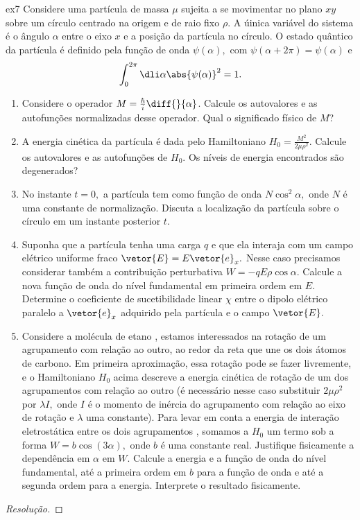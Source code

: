 \begin{exercício}{}{ex7}
    Considere uma partícula de massa \(\mu\) sujeita a se movimentar no plano \(xy\) sobre um círculo centrado na origem e de raio fixo \(\rho\). A úinica variável do sistema é o ângulo \(\alpha\) entre o eixo \(x\) e a posição da partícula no círculo. O estado quântico da partícula é definido pela função de onda \(\psi(\alpha),\) com \(\psi(\alpha + 2\pi) = \psi(\alpha)\) e
    \begin{equation*}
       \int_0^{2\pi}{\dli\alpha \abs{\psi(\alpha)}^2} = 1.
    \end{equation*}
    \begin{enumerate}[label=(\alph*)]
       \item Considere o operador \(M = \frac{\hbar}{i} \diff{}{\alpha}\). Calcule os autovalores e as autofunções normalizadas desse operador. Qual o significado físico de \(M\)?
       \item A energia cinética da partícula é dada pelo Hamiltoniano \(H_0 = \frac{M^2}{2 \mu \rho^2}.\) Calcule os autovalores e as autofunções de \(H_0.\) Os níveis de energia encontrados são degenerados?
       \item No instante \(t = 0,\) a partícula tem como função de onda \(N \cos^2 \alpha,\) onde \(N\) é uma constante de normalização. Discuta a localização da partícula sobre o círculo em um instante posterior \(t.\)
       \item Suponha que a partícula tenha uma carga \(q\) e que ela interaja com um campo elétrico uniforme fraco \(\vetor{E} = E\vetor{e}_x.\) Nesse caso precisamos considerar também a contribuição perturbativa \(W = -q E \rho \cos\alpha.\) Calcule a nova função de onda do nível fundamental em primeira ordem em \(E.\) Determine o coeficiente de sucetibilidade linear \(\chi\) entre o dipolo elétrico paralelo a \(\vetor{e}_x\) adquirido pela partícula e o campo \(\vetor{E}.\)
       \item Considere a molécula de etano , estamos interessados na rotação de um agrupamento  com relação ao outro, ao redor da reta que une os dois átomos de carbono. Em primeira aproximação, essa rotação pode se fazer livremente, e o Hamiltoniano \(H_0\) acima descreve a energia cinética de rotação de um dos agrupamentos  com relação ao outro (é necessário nesse caso substituir \(2 \mu \rho^2\) por \(\lambda I,\) onde \(I\) é o momento de inércia do agrupamento  com relação ao eixo de rotação e \(\lambda\) uma constante). Para levar em conta a energia de interação eletrostática entre os dois agrupamentos , somamos a \(H_0\) um termo sob a forma \(W = b \cos(3\alpha),\) onde \(b\) é uma constante real. Justifique fisicamente a dependência em \(\alpha\) em \(W\). Calcule a energia e a função de onda do nível fundamental, até a primeira ordem em \(b\) para a função de onda e até a segunda ordem para a energia. Interprete o resultado fisicamente.
    \end{enumerate}
\end{exercício}
\begin{proof}[Resolução]
    
\end{proof}

